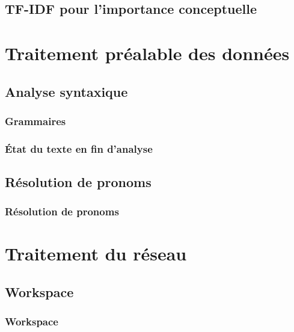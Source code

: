 \documentclass[12pt]{beamer}
\begin{document}
\subsection{TF-IDF pour l'importance conceptuelle}

\begin{frame}
 \frametitle{}
 
 
\end{frame}


\section{Traitement préalable des données}

\subsection{Analyse syntaxique}

\begin{frame}
 \frametitle{Grammaires}
 
 
\end{frame}

\begin{frame}
 \frametitle{État du texte en fin d'analyse}
 
 
\end{frame}

\subsection{Résolution de pronoms}

\begin{frame}[allowframebreaks = 0.7]
 \frametitle{Résolution de pronoms}
 
 
\end{frame}

\section{Traitement du réseau}

\subsection{Workspace}

\begin{frame}
 \frametitle{Workspace}
 
 
\end{frame}

\begin{frame}
 \frametitle{}
 
 
\end{frame}
\end{document}
